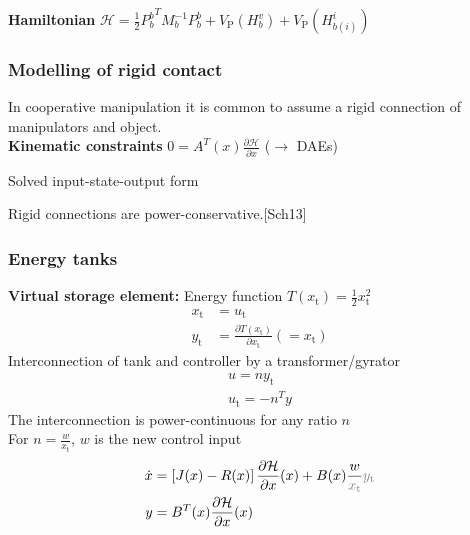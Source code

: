 \documentclass[student]{ITRslides}
\newcommand{\g}[1]{\text{#1}}
\begin{document}
\begin{frame}
{	\begin{figure}
		
		\def\svgwidth{0.4\columnwidth}
		
	\end{figure}
	\textbf{Hamiltonian} $\mathcal{H}= \frac{1}{2} {P_b^b}^T M_b^{-1} P_b^b + V_\g{P}(H_b^v) + V_\g{P}(H_{b(i)}^i)$}
	
\end{frame}

\begin{frame}
	\frametitle{Modelling of rigid contact}
	In cooperative manipulation it is common to assume a rigid connection of manipulators and object. \\
	\textbf{Kinematic constraints} $ 0 = A^T(x)\frac{\partial \mathcal{H}}{\partial x}$ ($\rightarrow$ DAEs)\\
	
	\begin{block}{Solved input-state-output form}
	\end{block}
Rigid connections are power-conservative.\nocite{Schaft13}{\tiny [Sch13]}

\end{frame}


\begin{frame}
	\frametitle{Energy tanks}
	\textbf{Virtual storage element:} Energy function $T(x_\g{t}) = \frac{1}{2}x_\g{t}^2$
	\begin{align*}
	x_\g{t} &= u_\g{t} \\
	y_\g{t} &= \frac{\partial T(x_\g{t})}{\partial x_\g{t}} (=x_\g{t})
	\end{align*}
	Interconnection of tank and controller by a transformer/gyrator
	\begin{align*}
		u = ny_\g{t}\\
		u_\g{t} = -n^T y
	\end{align*}
	The interconnection is power-continuous for any ratio $n$\\
	For $ n = \frac{w}{x_\g{t}}$, $w$ is the new control input
	\begin{align*}
	\dot{x} &= \left[J(x)-R(x)\right]\frac{\partial \mathcal{H}}{\partial x}(x) +B(x)\frac{w}{\color{gray}{x_\g{t}}}{\color{gray}y_\g{t}} \\
	y &= B^T(x)\frac{\partial \mathcal{H}}{\partial x}(x)
	\end{align*} 
\end{frame}
\end{document}
